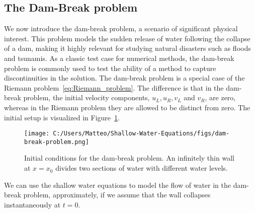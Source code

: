 \subsection{The Dam-Break problem}
We now introduce the dam-break problem, a scenario of significant physical interest.
This problem models the sudden release of water following the collapse of a dam, making it highly relevant for studying natural disasters such as floods and tsunamis.
As a classic test case for numerical methods, the dam-break problem is commonly used to test the ability of a method to capture discontinuities in the solution.
The dam-break problem is a special case of the Riemann problem~\eqref{eq:Riemann_problem}.
The difference is that in the dam-break problem, the initial velocity components, $u_L, u_R, v_L$ and $v_R$, are zero, whereas in the Riemann problem they are allowed to be distinct from zero.
The initial setup is visualized in Figure~\ref{fig:dam-break-problem}.
\begin{figure}[H]
    \centering
    \texttt{[image: C:/Users/Matteo/Shallow-Water-Equations/figs/dam-break-problem.png]}
    \caption{Initial conditions for the dam-break problem. An infinitely thin wall at $x=x_0$ divides two sections of water with different water levels.}\label{fig:dam-break-problem}
\end{figure}
We can use the shallow water equations to model the flow of water in the dam-break problem, approximately, if we assume that the wall collapses instantaneously at $t=0$.

